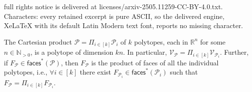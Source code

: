 \documentclass[10pt,a4paper]{amsart}
\newcommand{\R}{\mathbb{R}}
\newcommand{\faces}[1]{{\mathsf{faces}^\ast}\left(#1\right)}
\newcommand{\mP}{\mathcal{P}}
\newcommand{\verts}[1]{\mathcal{V}_{#1}}
\begin{document}
full rights notice is delivered at licenses/arxiv-2505.11259-CC-BY-4.0.txt. Characters: every retained excerpt is pure ASCII, so the delivered engine, XeLaTeX with its default Latin Modern text font, reports no missing character.
\begin{lemma}\label{fact:cart_prod_kpolytopes}
The Cartesian product $\mP = \Pi_{i \in [k]} \mP_i$ of $k$ polytopes, each in $\R^n$ for some $n \in \mathbb{N}_{>0}$, is a polytope of dimension $kn$.
In particular, $\verts{\mP} = \Pi_{i \in [k]}\verts{\mP_i}$.
Further, if $F_\mP \in \faces{\mP}$, then  $F_\mP$ is the product of faces of all the individual polytopes, i.e., $\forall i \in [k]$ there exist $F_{\mP_i} \in \faces{\mP_i}$ such that $F_\mP = \Pi_{i \in [k]} F_{\mP_i}$.
\end{lemma}
\end{document}
